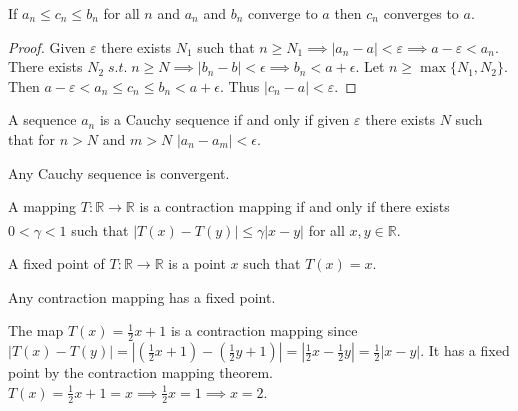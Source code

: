 \documentclass{article}
\newcommand{\R}{\mathbb{R}}
\newcommand{\eps}{\varepsilon}
\newcommand{\ra}[1][]{\xrightarrow{#1}}
\begin{document}
\begin{theorem}
If $a_n\leq c_n\leq b_n$ for all $n$ and $a_n$ and $b_n$ converge to $a$ then $c_n$ converges to $a$.
\end{theorem}
\begin{proof}
Given $\eps$ there exists $N_1$ such that $n\geq N_1\implies |a_n-a|<\eps\implies a-\eps<a_n$. There exists $N_2\; s.t. \; n\geq N\implies |b_n-b|<\epsilon\implies b_n<a+\epsilon$. Let $n\geq \max\{N_1,N_2\}$. Then $a-\eps<a_n\leq c_n\leq b_n<a+\epsilon$. Thus $|c_n-a|<\eps$.
\end{proof}
\begin{definition}
A sequence $a_n$ is a Cauchy sequence if and only if given $\eps$ there exists $N$ such that for $n>N$ and $m>N$ $|a_n-a_m|<\epsilon$.
\end{definition}
\begin{theorem}
Any Cauchy sequence is convergent.
\end{theorem}
\begin{definition}
A mapping $T:\R\xrightarrow[]{}\R$ is a contraction mapping if and only if there exists $0<\gamma<1$ such that $|T(x)-T(y)|\leq\gamma|x-y|$ for all $x,y\in\R$.
\end{definition}
\begin{definition}
A fixed point of $T:\R\ra\R$ is a point $x$ such that $T(x)=x$.
\end{definition}
\begin{theorem}
Any contraction mapping has a fixed point.
\end{theorem}
\begin{example}
The map $T(x)=\frac{1}{2}x+1$ is a contraction mapping since $|T(x)-T(y)|=|(\frac{1}{2}x+1)-(\frac{1}{2}y+1)|=|\frac{1}{2}x-\frac{1}{2}y|=\frac{1}{2}|x-y|$. It has a fixed point by the contraction mapping theorem. $T(x)=\frac{1}{2}x+1=x\implies \frac{1}{2}x=1\implies x=2$.
\end{example}
\end{document}

